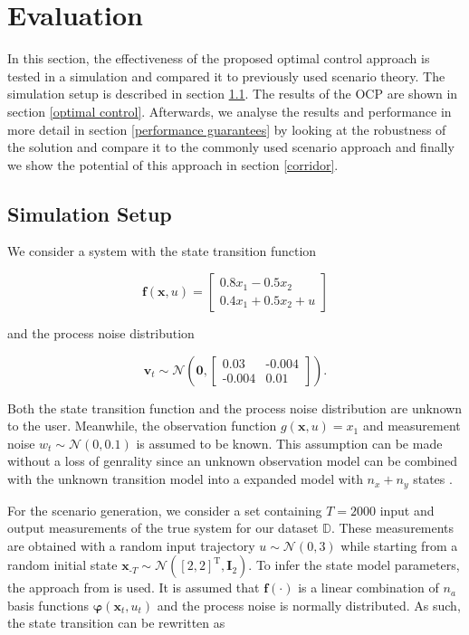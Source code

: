 \chapter{Evaluation} \label{Evaluation}

In this section, the effectiveness of the proposed optimal control approach is tested in a simulation and compared it to previously used scenario theory. The simulation setup is described in section \ref{Setup}. The results of the OCP are shown in section \ref{optimal control}. Afterwards, we analyse the results and performance in more detail in section \ref{performance guarantees} by looking at the robustness of the solution and compare it to the commonly used scenario approach and finally we show the potential of this approach in section \ref{corridor}.

\section{Simulation Setup} \label{Setup}

We consider a system with the state transition function

\begin{equation} \label{linear system}
\boldsymbol{f}(\boldsymbol{x}, u) = 
\begin{bmatrix}
0.8  x_1 - 0.5 x_2 \\
0.4 x_1 + 0.5 x_2 + u
\end{bmatrix}
\end{equation}

and the process noise distribution

\begin{equation}
\boldsymbol{v}_t \sim \mathcal{N} \left(\boldsymbol{0}, 
\begin{bmatrix}
0.03 & \text{-}0.004 \\
\text{-}0.004 & 0.01
\end{bmatrix}
\right).
\end{equation}

Both the state transition function and the process noise distribution are unknown to the user. Meanwhile, the observation function $g(\boldsymbol{x}, u) = x_1$ and measurement noise $w_t \sim \mathcal{N} (0, 0.1)$ is assumed to be known. This assumption can be made without a loss of genrality since an unknown observation model can be combined with the unknown transition model into a expanded model with $n_x + n_y$ states \cite{Frigola_15}.


For the scenario generation, we consider a set containing $T = 2000$ input and output measurements of the true system for our dataset $\mathbb{D}$. These measurements are obtained with a random input trajectory $u \sim \mathcal{N} (0, 3)$ while starting from a random initial state $\boldsymbol{x}_{\text{-}T} \sim \mathcal{N} ([2, 2]^\text{T}, \boldsymbol{I}_2)$. To infer the state model parameters, the approach from \cite{Svensson_17} is used. It is assumed that $\boldsymbol{f}(\cdot)$ is a linear combination of $n_a$ basis functions $\boldsymbol{\varphi}(\boldsymbol{x}_t, u_t)$ and the process noise is normally distributed. As such, the state transition can be rewritten as

